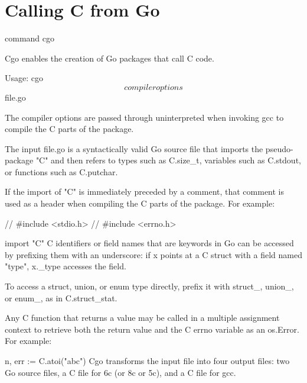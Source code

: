 
\section{Calling C from Go}
command cgo

Cgo enables the creation of Go packages that call C code.

Usage: cgo \[compiler options\] file.go

The compiler options are passed through uninterpreted when invoking gcc to compile the C parts of the package.

The input file.go is a syntactically valid Go source file that imports
the pseudo-package "C" and then refers to types such as C.size\_t,
variables such as C.stdout, or functions such as C.putchar.

If the import of "C" is immediately preceded by a comment, that comment
is used as a header when compiling the C parts of the package. For
example:

\begin{display}
// #include <stdio.h>
// #include <errno.h>
\end{display}
import "C"
C identifiers or field names that are keywords in Go can be accessed by
prefixing them with an underscore: if x points at a C struct with a
field named "type", x.\_type accesses the field.

To access a struct, union, or enum type directly, prefix it with
struct\_, union\_, or enum\_, as in C.struct\_stat.

Any C function that returns a value may be called in a multiple
assignment context to retrieve both the return value and the C errno
variable as an os.Error. For example:

n, err := C.atoi("abc")
Cgo transforms the input file into four output files: two Go source
files, a C file for 6c (or 8c or 5c), and a C file for gcc.

